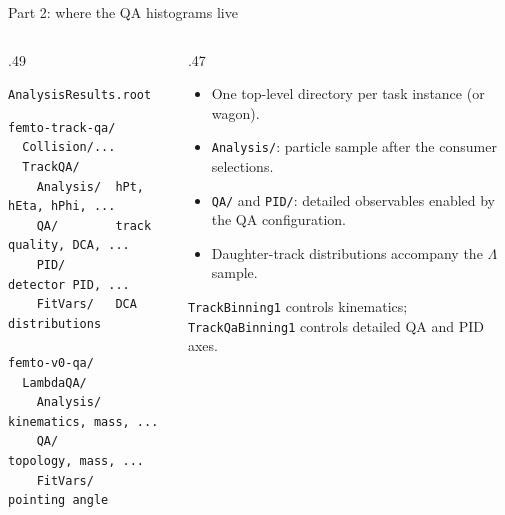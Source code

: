 \begin{frame}[fragile]{Part 2: where the QA histograms live}
 \begin{columns}[T]
 \begin{column}{.49\textwidth}
 \begin{block}{\texttt{AnalysisResults.root}}
 \begin{lstlisting}
femto-track-qa/
  Collision/...
  TrackQA/
    Analysis/  hPt, hEta, hPhi, ...
    QA/        track quality, DCA, ...
    PID/       detector PID, ...
    FitVars/   DCA distributions

femto-v0-qa/
  LambdaQA/
    Analysis/  kinematics, mass, ...
    QA/        topology, mass, ...
    FitVars/   pointing angle
 \end{lstlisting}
 \end{block}
 \end{column}
 \begin{column}{.47\textwidth}
 \small
 \begin{itemize}
 \item One top-level directory per task instance (or wagon).
 \item \texttt{Analysis/}: particle sample after the consumer selections.
 \item \texttt{QA/} and \texttt{PID/}: detailed observables enabled by the QA configuration.
 \item Daughter-track distributions accompany the $\Lambda$ sample.
 \end{itemize}
 \medskip
 \texttt{TrackBinning1} controls kinematics; \texttt{TrackQaBinning1} controls detailed QA and PID axes.
 \end{column}
 \end{columns}
\end{frame}

